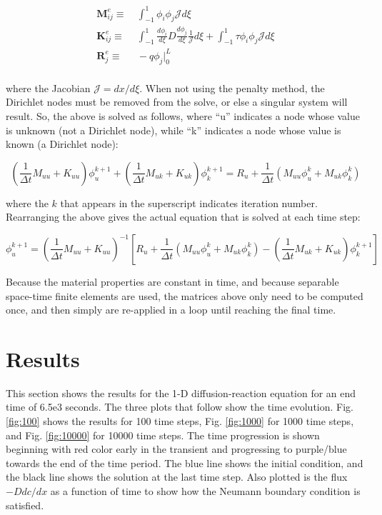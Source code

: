 \documentclass[10pt]{article}
\begin{document}
\begin{equation}
\label{eq:FEWeakForm_element5}
\begin{aligned}
\textbf{M}^e_{ij}\equiv&\ \int_{-1}^{1}\phi_i\phi_j\mathscr{J}d\xi\\
\textbf{K}_{ij}^e\equiv&\ \int_{-1}^{1}\frac{d\phi_i}{d\xi}D\frac{d\phi_j}{d\xi}\frac{1}{\mathscr{J}}d\xi+\int_{-1}^{1}\tau \phi_i\phi_j \mathscr{J}d\xi\\
\textbf{R}_{j}^e\equiv&\ -q\phi_j\biggr\rvert_{0}^{L}\\
\end{aligned}
\end{equation}

where the Jacobian \(\mathscr{J}=dx/d\xi\). When not using the penalty method, the Dirichlet nodes must be removed from the solve, or else a singular system will result. So, the above is solved as follows, where ``u'' indicates a node whose value is unknown (not a Dirichlet node), while ``k'' indicates a node whose value is known (a Dirichlet node):

\begin{equation}
\left(\frac{1}{\Delta t}M_{uu}+K_{uu}\right)\phi_{u}^{k+1}+\left(\frac{1}{\Delta t}M_{uk}+K_{uk}\right)\phi_k^{k+1}=R_u+\frac{1}{\Delta t}\left(M_{uu}\phi_u^k+M_{uk}\phi_k^k\right)
\end{equation}

where the \(k\) that appears in the superscript indicates iteration number. Rearranging the above gives the actual equation that is solved at each time step:

\begin{equation}
\phi_{u}^{k+1}=\left(\frac{1}{\Delta t}M_{uu}+K_{uu}\right)^{-1}\left\lbrack R_u+\frac{1}{\Delta t}\left(M_{uu}\phi_u^k+M_{uk}\phi_k^k\right)-\left(\frac{1}{\Delta t}M_{uk}+K_{uk}\right)\phi_k^{k+1}\right\rbrack
\end{equation}

Because the material properties are constant in time, and because separable space-time finite elements are used, the matrices above only need to be computed once, and then simply are re-applied in a loop until reaching the final time. 

\section{Results}

This section shows the results for the 1-D diffusion-reaction equation for an end time of 6.5e3 seconds. The three plots that follow show the time evolution. Fig. \ref{fig:100} shows the results for 100 time steps, Fig. \ref{fig:1000} for 1000 time steps, and Fig. \ref{fig:10000} for 10000 time steps. The time progression is shown beginning with red color early in the transient and progressing to purple/blue towards the end of the time period. The blue line shows the initial condition, and the black line shows the solution at the last time step. Also plotted is the flux \(-Ddc/dx\) as a function of time to show how the Neumann boundary condition is satisfied.
\end{document}
